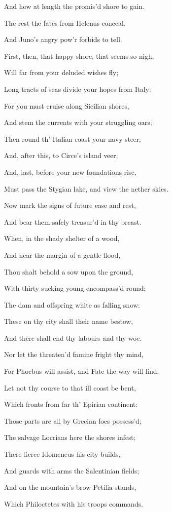 And how at length the promis’d shore to gain.

The rest the fates from Helenus conceal,

And Juno’s angry pow’r forbids to tell.

First, then, that happy shore, that seems so nigh,

Will far from your deluded wishes fly;

Long tracts of seas divide your hopes from Italy:

For you must cruise along Sicilian shores,

And stem the currents with your struggling oars;

Then round th’ Italian coast your navy steer;

And, after this, to Circe’s island veer;

And, last, before your new foundations rise,

Must pass the Stygian lake, and view the nether skies.

Now mark the signs of future ease and rest,

And bear them safely treasur’d in thy breast.

When, in the shady shelter of a wood,

And near the margin of a gentle flood,

Thou shalt behold a sow upon the ground,

With thirty sucking young encompass’d round;

The dam and offspring white as falling snow:

These on thy city shall their name bestow,

And there shall end thy labours and thy woe.

Nor let the threaten’d famine fright thy mind,

For Phoebus will assist, and Fate the way will find.

Let not thy course to that ill coast be bent,

Which fronts from far th’ Epirian continent:

Those parts are all by Grecian foes possess’d;

The salvage Locrians here the shores infest;

There fierce Idomeneus his city builds,

And guards with arms the Salentinian fields;

And on the mountain’s brow Petilia stands,

Which Philoctetes with his troops commands.

